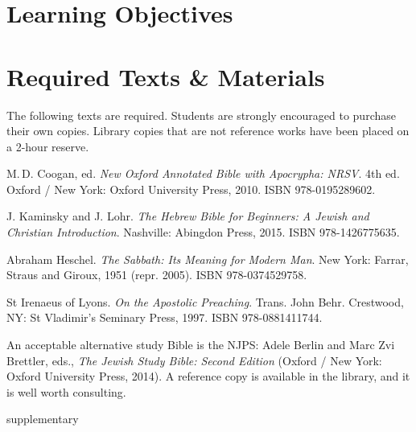 \documentclass[titlepage]{article}
\newcommand\incl{../includes}
\begin{document}


\section{Learning Objectives}
\label{objectives}

\edobject

\section{Required Texts \& Materials}
\label{texts}

The following texts are required. Students are strongly encouraged to
purchase their own copies. Library copies that are not reference works
have been placed on a 2-hour reserve.

\begingroup
\renewcommand{\section}[2]{}%
\begin{thebibliography}{Irenaeus}%

	 M.\,D. Coogan, ed.
    \emph{New Oxford Annotated Bible with Apocrypha: NRSV}. 4th ed.
    Oxford / New York: Oxford University Press, 2010.
    ISBN 978-0195289602.

	 J. Kaminsky and J. Lohr.
	\emph{The Hebrew Bible for Beginners: A Jewish and Christian Introduction}.
	Nashville: Abingdon Press, 2015.
	ISBN 978-1426775635.

	 Abraham Heschel.
	\emph{The Sabbath: Its Meaning for Modern Man}.
	New York: Farrar, Straus and Giroux, 1951 (repr. 2005).
	ISBN 978-0374529758.

	 St Irenaeus of Lyons.
	\emph{On the Apostolic Preaching}.
	Trans. John Behr.
	Crestwood, NY: St Vladimir’s Seminary Press, 1997.
	ISBN 978-0881411744.

\end{thebibliography}
\endgroup

An acceptable alternative study Bible is the NJPS: Adele Berlin and Marc
Zvi Brettler, eds., \emph{The Jewish Study Bible: Second Edition}
(Oxford / New York: Oxford University Press, 2014). A reference copy is
available in the library, and it is well worth consulting.

\section{Supplementary Texts}
\label{supplementary}
\end{document}
